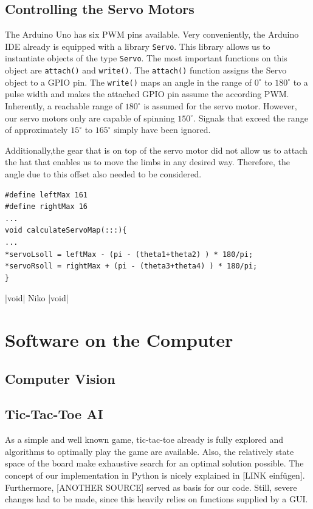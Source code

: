 \documentclass{sig-alternate-05-2015}
\begin{document}
\subsection{Controlling the Servo Motors}
The Arduino Uno has six PWM pins available.
Very conveniently, the Arduino IDE already is equipped with a library \texttt{Servo}. This library allows us to instantiate objects of the type \texttt{Servo}. The most important functions on this object are \texttt{attach()} and \texttt{write()}. The \texttt{attach()} function assigns the Servo object to a GPIO pin. The \texttt{write()} maps an angle in the range of $0^\circ$ to $180^\circ$ to a pulse width and makes the attached GPIO pin assume the according PWM. Inherently, a reachable range of $180^\circ$ is assumed for the servo motor. However, our servo motors only are capable of spinning $150^\circ$. Signals that exceed the range of approximately $15^\circ$ to $165^\circ$ simply have been ignored.

Additionally,the gear that is on top of the servo motor did not allow us to attach the hat that enables us to move the limbs in any desired way. Therefore, the angle due to this offset also needed to be considered. 
\begin{lstlisting}[caption = Niko]
#define leftMax 161
#define rightMax 16
...
void calculateServoMap(:::){
...
*servoLsoll = leftMax - (pi - (theta1+theta2) ) * 180/pi; 
*servoRsoll = rightMax + (pi - (theta3+theta4) ) * 180/pi;
}
\end{lstlisting}

|void| Niko |void|

\section{Software on the Computer}
\subsection{Computer Vision}
\subsection{Tic-Tac-Toe AI}
As a simple and well known game, tic-tac-toe already is fully explored and algorithms to optimally play the game are available. Also, the relatively state space of the board make exhaustive search for an optimal solution possible. The concept of our implementation in Python is nicely explained in [LINK einfügen].%
 Furthermore, [ANOTHER SOURCE] served as basis for our code. Still, severe changes had to be made, since this heavily relies on functions supplied by a GUI.
\end{document}
